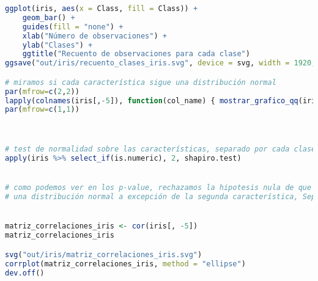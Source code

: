 \begin{lstlisting}[language=R]
ggplot(iris, aes(x = Class, fill = Class)) +
	geom_bar() +
	guides(fill = "none") +
	xlab("Número de observaciones") +
	ylab("Clases") +
	ggtitle("Recuento de observaciones para cada clase")
ggsave("out/iris/recuento_clases_iris.svg", device = svg, width = 1920, height = 1080, units = "px", dpi = 150)

# miramos si cada característica sigue una distribución normal
par(mfrow=c(2,2))
lapply(colnames(iris[,-5]), function(col_name) { mostrar_grafico_qq(iris[,col_name], col_name, save_plot = TRUE) } )
par(mfrow=c(1,1))



# test de normalidad sobre las características, separado por cada clase
apply(iris %>% select_if(is.numeric), 2, shapiro.test)


# como podemos ver en los p-value, rechazamos la hipotesis nula de que los datos siguen
# una distribución normal a excepción de la segunda característica, SepalWidth ,por muy poco


matriz_correlaciones_iris <- cor(iris[, -5])
matriz_correlaciones_iris

svg("out/iris/matriz_correlaciones_iris.svg")
corrplot(matriz_correlaciones_iris, method = "ellipse")
dev.off()
\end{lstlisting}
